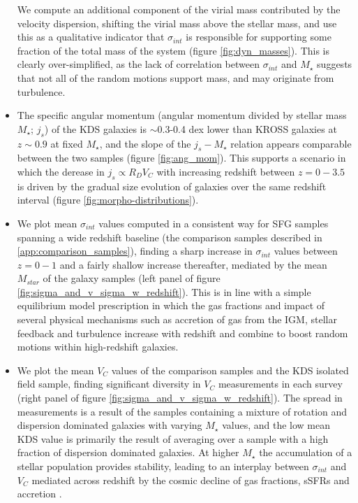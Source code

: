 \documentclass[fleqn,usenatbib]{mn2e}
\begin{document}
\begin{itemize}
    We compute an additional component of the virial mass contributed by the velocity dispersion, shifting the virial mass above the stellar mass, and use this as a qualitative indicator that $\sigma_{int}$ is responsible for supporting some fraction of the total mass of the system (figure \ref{fig:dyn_masses}).
    This is clearly over-simplified, as the lack of correlation between $\sigma_{int}$ and $M_{\star}$ suggests that not all of the random motions support mass, and may originate from turbulence.
    \item The specific angular momentum (angular momentum divided by stellar mass $M_{\star}$; $j_{s}$) of the KDS galaxies is $\sim$0.3-0.4 dex lower than KROSS galaxies at $z\sim0.9$ at fixed $M_{\star}$, and the slope of the $j_{s}-M_{\star}$ relation appears comparable between the two samples (figure \ref{fig:ang_mom}).
    This supports a scenario in which the derease in $j_{s} \propto R_{D}V_{C}$ with increasing redshift between $z=0-3.5$ is driven by the gradual size evolution of galaxies over the same redshift interval (figure \ref{fig:morpho-distributions}).
    \item We plot mean $\sigma_{int}$ values computed in a consistent way for SFG samples spanning a wide redshift baseline (the comparison samples described in \cref{app:comparison_samples}), finding a sharp increase in $\sigma_{int}$ values between $z=0-1$ and a fairly shallow increase thereafter, mediated by the mean $M_{star}$ of the galaxy samples (left panel of figure \ref{fig:sigma_and_v_sigma_w_redshift}).
    This is in line with a simple equilibrium model prescription in which the gas fractions and impact of several physical mechanisms such as accretion of gas from the IGM, stellar feedback and turbulence increase with redshift and combine to boost random motions within high-redshift galaxies.
    \item We plot the mean $V_{C}$ values of the comparison samples and the KDS isolated field sample, finding significant diversity in $V_{C}$ measurements in each survey (right panel of figure \ref{fig:sigma_and_v_sigma_w_redshift}).
    The spread in measurements is a result of the samples containing a mixture of rotation and dispersion dominated galaxies with varying $M_{\star}$ values, and the low mean KDS value is primarily the result of averaging over a sample with a high fraction of dispersion dominated galaxies.
    At higher $M_{\star}$ the accumulation of a stellar population provides stability, leading to an interplay between $\sigma_{int}$ and $V_{C}$ mediated across redshift by the cosmic decline of gas fractions, sSFRs and accretion \citep[e.g.][]{Wisnioski2015}. 

\end{itemize}
\end{document}
